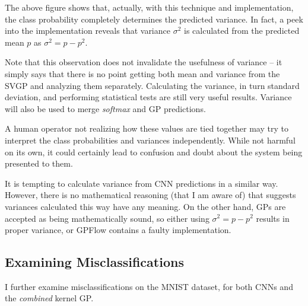 \documentclass{article}
\begin{document}
The above figure shows that, actually, with this technique and implementation, the class probability completely determines the predicted variance. In fact, a peek into the implementation reveals that variance $\sigma^2$ is calculated from the predicted mean $p$ as $\sigma^2 = p - p^2$.

Note that this observation does not invalidate the usefulness of variance -- it simply says that there is no point getting both mean and variance from the SVGP and analyzing them separately. Calculating the variance, in turn standard deviation, and performing statistical tests are still very useful results. Variance will also be used to merge \textit{softmax} and GP predictions.

A human operator not realizing how these values are tied together may try to interpret the class probabilities and variances independently. While not harmful on its own, it could certainly lead to confusion and doubt about the system being presented to them.

It is tempting to calculate variance from CNN predictions in a similar way. However, there is no mathematical reasoning (that I am aware of) that suggests variances calculated this way have any meaning. On the other hand, GPs are accepted as being mathematically sound, so either using $\sigma^2 = p - p^2$ results in proper variance, or GPFlow contains a faulty implementation.


\subsection{Examining Misclassifications}

I further examine misclassifications on the MNIST dataset, for both CNNs and the \textit{combined} kernel GP.

\end{document}
